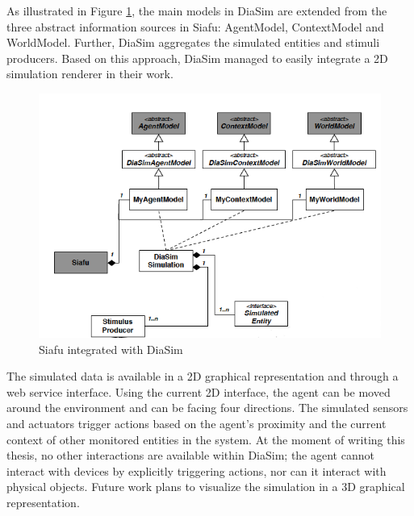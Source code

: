 As illustrated in Figure \ref{fig:diasim_and_siafu}, the main models in DiaSim are extended from the three abstract information sources in Siafu: AgentModel, ContextModel and WorldModel. Further, DiaSim aggregates the simulated entities and stimuli producers. Based on this approach, DiaSim managed to easily integrate a 2D simulation renderer in their work.

\begin{figure}[H]
	\centering
	\includegraphics[width=\linewidth]{gfx/Chapter2/diasim_and_siafu}
	\caption{Siafu integrated with DiaSim}
	\label{fig:diasim_and_siafu}
\end{figure}

The simulated data is available in a 2D graphical representation and through a web service interface. Using the current 2D interface, the agent can be moved around the environment and can be facing four directions. The simulated sensors and actuators trigger actions based on the agent's proximity and the current context of other monitored entities in the system. At the moment of writing this thesis, no other interactions are available within DiaSim; the agent cannot interact with devices by explicitly triggering actions, nor can it interact with physical objects. Future work plans to visualize the simulation in a 3D graphical representation.\\
